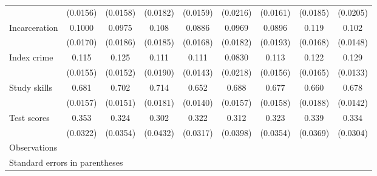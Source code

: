 \begin{tabular}{l*{8}{c}}
                    &    (0.0156)&    (0.0158)&    (0.0182)&    (0.0159)&    (0.0216)&    (0.0161)&    (0.0185)&    (0.0205)\\
[1em]
Incarceration       &      0.1000&      0.0975&       0.108&      0.0886&      0.0969&      0.0896&       0.119&       0.102\\
                    &    (0.0170)&    (0.0186)&    (0.0185)&    (0.0168)&    (0.0182)&    (0.0193)&    (0.0168)&    (0.0148)\\
[1em]
Index crime         &       0.115&       0.125&       0.111&       0.111&      0.0830&       0.113&       0.122&       0.129\\
                    &    (0.0155)&    (0.0152)&    (0.0190)&    (0.0143)&    (0.0218)&    (0.0156)&    (0.0165)&    (0.0133)\\
[1em]
Study skills        &       0.681&       0.702&       0.714&       0.652&       0.688&       0.677&       0.660&       0.678\\
                    &    (0.0157)&    (0.0151)&    (0.0181)&    (0.0140)&    (0.0157)&    (0.0158)&    (0.0188)&    (0.0142)\\
[1em]
Test scores         &       0.353&       0.324&       0.302&       0.322&       0.312&       0.323&       0.339&       0.334\\
                    &    (0.0322)&    (0.0354)&    (0.0432)&    (0.0317)&    (0.0398)&    (0.0354)&    (0.0369)&    (0.0304)\\
\hline
Observations        &            &            &            &            &            &            &            &            \\
\hline\hline
\multicolumn{9}{l}{\footnotesize Standard errors in parentheses}\\
\end{tabular}
